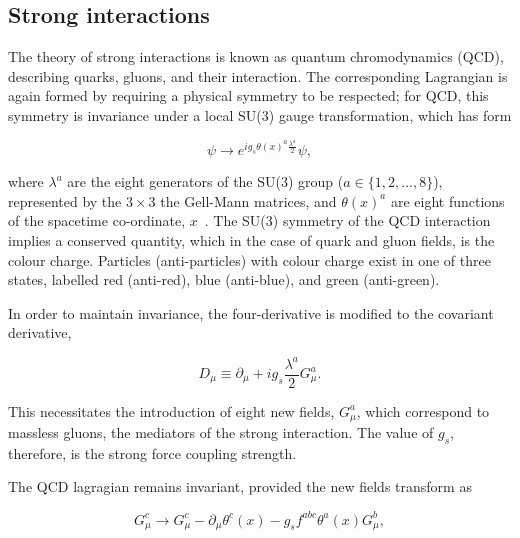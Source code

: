 \subsection{Strong interactions}

The theory of strong interactions is known as quantum chromodynamics (QCD), describing quarks, gluons, and their interaction. The corresponding Lagrangian is again formed by requiring a physical symmetry to be respected; for QCD, this symmetry is invariance under a local SU(3) gauge transformation, which has form

\begin{equation}
    \psi \rightarrow e^{ig_{s}\theta(x)^{a}\frac{\lambda^{a}}{2}}\psi,
\end{equation} %

\noindent where $\lambda^{a}$ are the eight generators of the SU(3) group ($a\in\{1,2,...,8\}$), represented by the $3\times3$ the Gell-Mann matrices, and $\theta(x)^{a}$ are eight functions of the spacetime co-ordinate, $x$~\cite{Thomson}. The SU(3) symmetry of the QCD interaction implies a conserved quantity, which in the case of quark and gluon fields, is the colour charge. Particles (anti-particles) with colour charge exist in one of three states, labelled red (anti-red), blue (anti-blue), and green (anti-green). %

In order to maintain invariance, the four-derivative is modified to the covariant derivative,

\begin{equation}
    D_{\mu} \equiv \partial_{\mu} + ig_{s}\frac{\lambda^{a}}{2}G^{a}_{\mu}.
\end{equation}

\noindent This necessitates the introduction of eight new fields, $G_{\mu}^{a}$, which correspond to massless gluons, the mediators of the strong interaction. The value of $g_{s}$, therefore, is the strong force coupling strength. 

The QCD lagragian remains invariant, provided the new fields transform as

\begin{equation}
    G_{\mu}^{c} \rightarrow G_{\mu}^{c} - \partial_{\mu}\theta^{c}(x) - g_{s}f^{abc}\theta^{a}(x)G_{\mu}^{b},
\end{equation}

